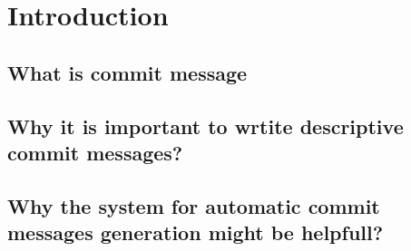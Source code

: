 \chapter{Introduction}\label{chap:intro}

\section{What is commit message}

\section{Why it is important to wrtite descriptive commit messages?}

\section{Why the system for automatic commit messages generation might be helpfull?}